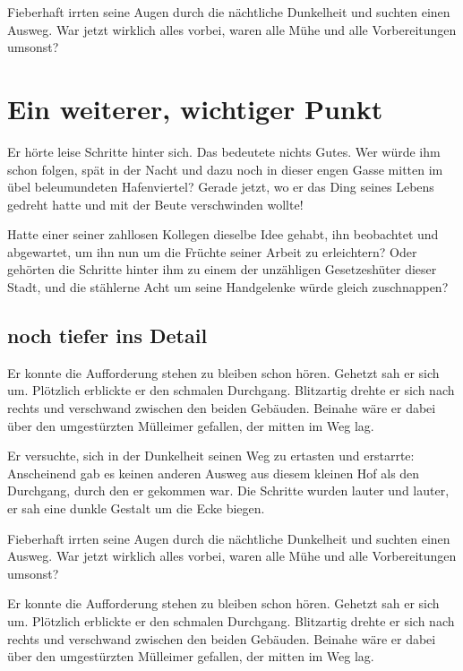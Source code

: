\documentclass[12pt,ngerman,a4paper,DIV=9,headinclude=true,footinclude=false,titlepage=true,headsepline=true,toc=bibliography,toc=listof]{scrartcl}
\begin{document}
Fieberhaft irrten seine Augen durch die nächtliche Dunkelheit und
suchten einen Ausweg. War jetzt wirklich alles vorbei, waren alle Mühe
und alle Vorbereitungen umsonst?

\section{Ein weiterer, wichtiger
Punkt}\label{ein-weiterer-wichtiger-punkt}

Er hörte leise Schritte hinter sich. Das bedeutete nichts Gutes. Wer
würde ihm schon folgen, spät in der Nacht und dazu noch in dieser engen
Gasse mitten im übel beleumundeten Hafenviertel? Gerade jetzt, wo er das
Ding seines Lebens gedreht hatte und mit der Beute verschwinden wollte!

Hatte einer seiner zahllosen Kollegen dieselbe Idee gehabt, ihn
beobachtet und abgewartet, um ihn nun um die Früchte seiner Arbeit zu
erleichtern? Oder gehörten die Schritte hinter ihm zu einem der
unzähligen Gesetzeshüter dieser Stadt, und die stählerne Acht um seine
Handgelenke würde gleich zuschnappen?

\subsection{noch tiefer ins Detail}\label{noch-tiefer-ins-detail}

Er konnte die Aufforderung stehen zu bleiben schon hören. Gehetzt sah er
sich um. Plötzlich erblickte er den schmalen Durchgang. Blitzartig
drehte er sich nach rechts und verschwand zwischen den beiden Gebäuden.
Beinahe wäre er dabei über den umgestürzten Mülleimer gefallen, der
mitten im Weg lag.

Er versuchte, sich in der Dunkelheit seinen Weg zu ertasten und
erstarrte: Anscheinend gab es keinen anderen Ausweg aus diesem kleinen
Hof als den Durchgang, durch den er gekommen war. Die Schritte wurden
lauter und lauter, er sah eine dunkle Gestalt um die Ecke biegen.

Fieberhaft irrten seine Augen durch die nächtliche Dunkelheit und
suchten einen Ausweg. War jetzt wirklich alles vorbei, waren alle Mühe
und alle Vorbereitungen umsonst?

Er konnte die Aufforderung stehen zu bleiben schon hören. Gehetzt sah er
sich um. Plötzlich erblickte er den schmalen Durchgang. Blitzartig
drehte er sich nach rechts und verschwand zwischen den beiden Gebäuden.
Beinahe wäre er dabei über den umgestürzten Mülleimer gefallen, der
mitten im Weg lag.
\end{document}
